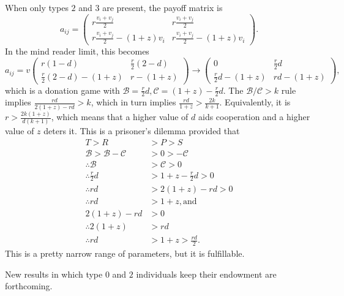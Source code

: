 \documentclass[13pt]{amsart}
\newcommand{\B}{\mathcal{B}}
\newcommand{\C}{\mathcal{C}}
\begin{document}
When only types $2$ and $3$ are present, the payoff matrix is
\begin{equation}
    a_{ij} =
    \begin{pmatrix}
        r\frac{v_i + v_j}{2} & r\frac{v_i + v_j}{2} \\
        r\frac{v_i + v_j}{2} - (1+z)v_i & r\frac{v_i + v_j}{2} - (1+z)v_i
    \end{pmatrix}.
\end{equation}
In the mind reader limit, this becomes
\begin{equation}
    a_{ij} = v
    \begin{pmatrix}
        r(1-d) & \frac{r}{2}(2-d) \\
        \frac{r}{2}(2-d) - (1+z) & r - (1+z)
    \end{pmatrix}
    \to
    \begin{pmatrix}
        0 & \frac{r}{2}d \\
        \frac{r}{2}d - (1+z) & rd - (1+z)
    \end{pmatrix},
\end{equation}
which is a donation game with $\B = \frac{r}{2}d, \C = (1+z) - \frac{r}{2}d$.
The $\B/\C > k$ rule implies $\frac{rd}{2(1+z) - rd} > k$, which in turn implies $\frac{rd}{1+z} > \frac{2k}{k+1}$.
Equivalently, it is $r > \frac{2k(1+z)}{d(k+1)}$, which means that a higher value of $d$ aids cooperation and a higher value of $z$ deters it.
This is a prisoner's dilemma provided that
\begin{equation}
    \begin{split}
        T > R & > P > S \\
        \B > \B - \C & > 0 > -\C \\
        \therefore \B & > \C > 0 \\
        \therefore \frac{r}{2}d & > 1+z - \frac{r}{2}d > 0 \\
        \therefore rd & > 2(1+z) - rd > 0 \\
        \therefore rd & > 1+z, \text{and} \\
        2(1+z) - rd & > 0 \\
        \therefore 2(1+z) & > rd \\
        \therefore rd & > 1 + z > \frac{rd}{2}.
    \end{split}
\end{equation}
This is a pretty narrow range of parameters, but it is fulfillable.

New results in which type $0$ and $2$ individuals keep their endowment are forthcoming.
\end{document}
